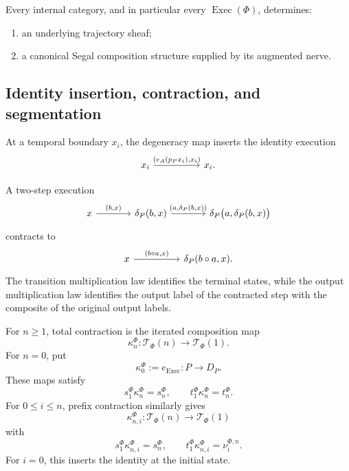 \begin{corollary}
\label{cor:canonical-segal-composition-execution}
Every internal category, and in particular every
\(\operatorname{Exec}(\Phi)\), determines:
\begin{enumerate}
    \item an underlying trajectory sheaf;
    \item a canonical Segal composition structure supplied by its augmented
    nerve.
\end{enumerate}
\end{corollary}

\subsection{Identity insertion, contraction, and segmentation}
\label{subsec:execution-identity-contraction}

At a temporal boundary \(x_i\), the degeneracy map inserts the identity
execution
\[
\begin{tikzcd}[column sep=huge]
    x_i
        \arrow[r, "{(e_A(p_Px_i),x_i)}"]
    &
    x_i.
\end{tikzcd}
\]

A two-step execution
\[
\begin{tikzcd}[column sep=large]
    x
        \arrow[r, "{(b,x)}"]
    &
    \delta_P(b,x)
        \arrow[r, "{(a,\delta_P(b,x))}"]
    &
    \delta_P\bigl(a,\delta_P(b,x)\bigr)
\end{tikzcd}
\]
contracts to
\[
\begin{tikzcd}[column sep=huge]
    x
        \arrow[r, "{(b\circ a,x)}"]
    &
    \delta_P(b\circ a,x).
\end{tikzcd}
\]
The transition multiplication law identifies the terminal states, while the
output multiplication law identifies the output label of the contracted step
with the composite of the original output labels.

For \(n\geq1\), total contraction is the iterated composition map
\[
    \kappa_n^\Phi:
    \mathscr T_\Phi(n)
    \longrightarrow
    \mathscr T_\Phi(1).
\]
For \(n=0\), put
\[
    \kappa_0^\Phi:=e_{\operatorname{Exec}}:P\to D_P.
\]
These maps satisfy
\[
    s_1^\Phi\kappa_n^\Phi=s_n^\Phi,
    \qquad
    t_1^\Phi\kappa_n^\Phi=t_n^\Phi.
\]
For \(0\leq i\leq n\), prefix contraction similarly gives
\[
    \kappa_{n,i}^\Phi:
    \mathscr T_\Phi(n)
    \longrightarrow
    \mathscr T_\Phi(1)
\]
with
\[
    s_1^\Phi\kappa_{n,i}^\Phi=s_n^\Phi,
    \qquad
    t_1^\Phi\kappa_{n,i}^\Phi=\nu_i^{\Phi,n}.
\]
For \(i=0\), this inserts the identity at the initial state.

